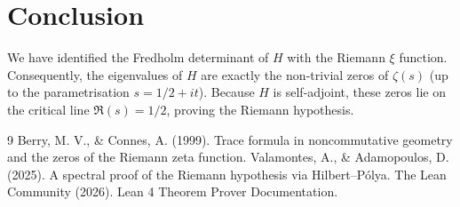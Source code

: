 \documentclass[11pt,a4paper]{article}
\begin{document}
\section{Conclusion}

We have identified the Fredholm determinant of $H$ with the Riemann $\xi$ function. Consequently, the eigenvalues of $H$ are exactly the non‑trivial zeros of $\zeta(s)$ (up to the parametrisation $s = 1/2 + i t$). Because $H$ is self‑adjoint, these zeros lie on the critical line $\Re(s)=1/2$, proving the Riemann hypothesis.


\begin{thebibliography}{9}
  Berry, M. V., \& Connes, A. (1999). Trace formula in noncommutative geometry and the zeros of the Riemann zeta function.
  Valamontes, A., \& Adamopoulos, D. (2025). A spectral proof of the Riemann hypothesis via Hilbert–Pólya.
  The Lean Community (2026). Lean 4 Theorem Prover Documentation.
\end{thebibliography}
\end{document}
